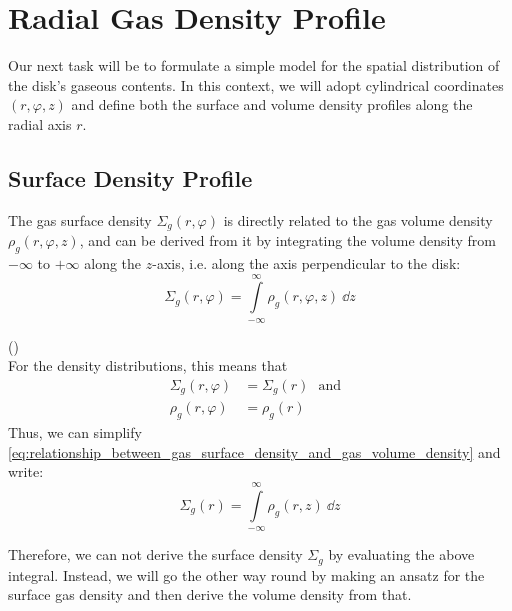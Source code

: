 \newpage\section{Radial Gas Density Profile}

    Our next task will be to formulate a simple model for the spatial distribution of the disk's 
    gaseous contents. In this context, we will adopt cylindrical coordinates $(r, \varphi, z)$ and
    define both the surface and volume density profiles along the radial axis $r$.

    \subsection{Surface Density Profile}

        The gas surface density $\Sigma_g(r,\varphi)$ is directly related to the gas volume density
        $\rho_g(r,\varphi,z)$, and can be derived from it by integrating the volume density from 
        $-\infty$ to $+\infty$ along the $z$-axis, i.e. along the axis perpendicular to the disk:
        \begin{equation}
            \label{eq:relationship_between_gas_surface_density_and_gas_volume_density}
            \Sigma_g(r,\varphi)
                = \int\limits_{-\infty}^{\infty} \rho_g(r,\varphi,z)\ \dd z
        \end{equation}

         () \\
        For the density distributions, this means that
        \begin{align}
            \Sigma_g(r, \varphi) 
                &= \Sigma_g(r) 
            \ \ \ \text{and}\ \ \
            \\
            \rho_g(r, \varphi) 
                &= \rho_g(r)
        \end{align}
        Thus, we can simplify 
        \cref{eq:relationship_between_gas_surface_density_and_gas_volume_density} and write:
        \begin{equation}
            \Sigma_g(r)
                = \int\limits_{-\infty}^{\infty} \rho_g(r,z)\ \dd z
        \end{equation}
        
        Therefore, we can not derive the surface density $\Sigma_g$ by evaluating the above
        integral. Instead, we will go the other way round by making an ansatz for the surface gas
        density and then derive the volume density from that. \\

